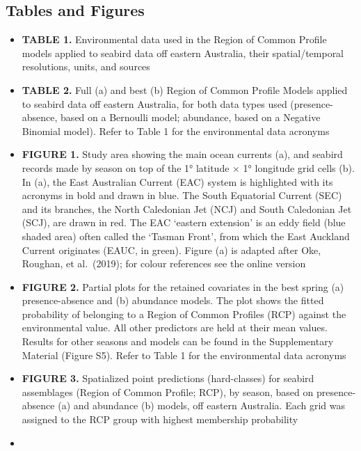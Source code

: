 \documentclass{article}
\providecommand{\tightlist}{%
  \setlength{\itemsep}{0pt}\setlength{\parskip}{0pt}}
\begin{document}
\begin{linenumbers}
\newpage

\hypertarget{tables-and-figures}{%
\section*{Tables and Figures}\label{tables-and-figures}}

\begin{itemize}
\tightlist
\item
  \textbf{TABLE 1.} Environmental data used in the Region of Common Profile models applied to seabird data off eastern Australia, their spatial/temporal resolutions, units, and sources
\item
  \textbf{TABLE 2.} Full (a) and best (b) Region of Common Profile Models applied to seabird data off eastern Australia, for both data types used (presence-absence, based on a Bernoulli model; abundance, based on a Negative Binomial model). Refer to Table 1 for the environmental data acronyms
\item
  \textbf{FIGURE 1.} Study area showing the main ocean currents (a), and seabird records made by season on top of the 1° latitude × 1° longitude grid cells (b). In (a), the East Australian Current (EAC) system is highlighted with its acronyms in bold and drawn in blue. The South Equatorial Current (SEC) and its branches, the North Caledonian Jet (NCJ) and South Caledonian Jet (SCJ), are drawn in red. The EAC `eastern extension' is an eddy field (blue shaded area) often called the `Tasman Front', from which the East Auckland Current originates (EAUC, in green). Figure (a) is adapted after Oke, Roughan, et al.~(2019); for colour references see the online version
\item
  \textbf{FIGURE 2.} Partial plots for the retained covariates in the best spring (a) presence-absence and (b) abundance models. The plot shows the fitted probability of belonging to a Region of Common Profiles (RCP) against the environmental value. All other predictors are held at their mean values. Results for other seasons and models can be found in the Supplementary Material (Figure S5). Refer to Table 1 for the environmental data acronyms
\item
  \textbf{FIGURE 3.} Spatialized point predictions (hard-classes) for seabird assemblages (Region of Common Profile; RCP), by season, based on presence-absence (a) and abundance (b) models, off eastern Australia. Each grid was assigned to the RCP group with highest membership probability
\item

\end{itemize}
\end{linenumbers}
\end{document}
